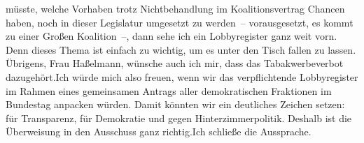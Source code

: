 \documentclass{article}
\begin{document}
müsste, welche Vorhaben trotz Nichtbehandlung im Koalitionsvertrag Chancen haben, noch in dieser Legislatur umgesetzt zu werden – vorausgesetzt, es kommt zu einer Großen Koalition –, dann sehe ich ein Lobbyregister ganz weit vorn. Denn dieses Thema ist einfach zu wichtig, um es unter den Tisch fallen zu lassen. Übrigens, Frau Haßelmann, wünsche auch ich mir, dass das Tabakwerbeverbot dazugehört.Ich würde mich also freuen, wenn wir das verpflichtende Lobbyregister im Rahmen eines gemeinsamen Antrags aller demokratischen Fraktionen im Bundestag anpacken würden. Damit könnten wir ein deutliches Zeichen setzen: für Transparenz, für Demokratie und gegen Hinterzimmerpolitik. Deshalb ist die Überweisung in den Ausschuss ganz richtig.Ich schließe die Aussprache.
\end{document}
